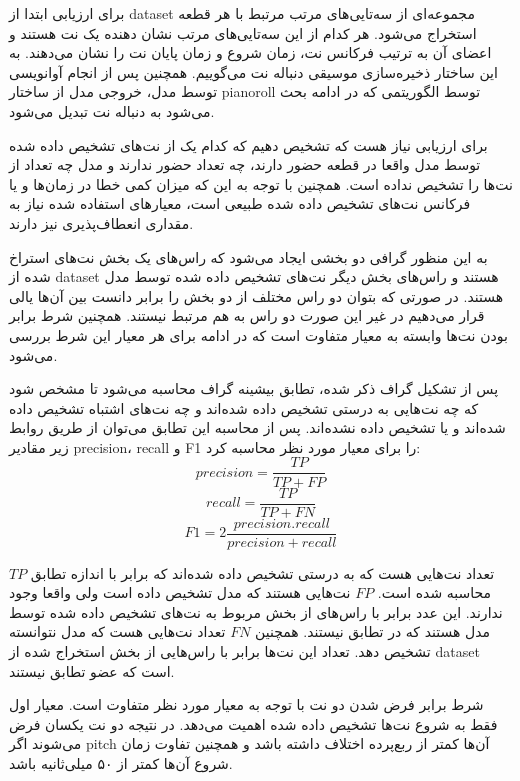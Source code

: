 برای ارزیابی ابتدا از \gls{dataset} مجموعه‌ای از سه‌تایی‌های مرتب مرتبط با هر
قطعه استخراج می‌شود. هر کدام از این سه‌تایی‌های مرتب نشان دهنده یک نت هستند و
اعضای آن به ترتیب فرکانس نت، زمان شروع و زمان پایان نت را نشان می‌دهند. به این
ساختار ذخیره‌سازی موسیقی دنباله نت می‌گوییم. همچنین پس از انجام آوانویسی توسط
مدل، خروجی مدل از ساختار \gls{pianoroll} توسط الگوریتمی که در ادامه بحث می‌شود
به دنباله نت تبدیل می‌شود.

برای ارزیابی نیاز هست که تشخیص دهیم که کدام یک از نت‌های تشخیص داده شده توسط مدل
واقعا در قطعه حضور دارند، چه تعداد حضور ندارند و مدل چه تعداد از نت‌ها را تشخیص
نداده است. همچنین با توجه به این که میزان کمی خطا در زمان‌ها و یا فرکانس نت‌های
تشخیص داده شده طبیعی است، معیارهای استفاده شده نیاز به مقداری انعطاف‌پذیری نیز
دارند.

به این منظور گرافی دو بخشی ایجاد می‌شود که راس‌های یک بخش نت‌های استراخ شده از
\gls{dataset} هستند و راس‌های بخش دیگر نت‌های تشخیص داده شده توسط مدل هستند. در
صورتی که بتوان دو راس مختلف از دو بخش را برابر دانست بین‌ آن‌ها یالی قرار
می‌دهیم در غیر این صورت دو راس به هم مرتبط نیستند. همچنین شرط برابر بودن نت‌ها
وابسته به معیار متفاوت است که در ادامه برای هر معیار این شرط بررسی می‌شود.

پس از تشکیل گراف ذکر شده، تطابق بیشینه گراف محاسبه می‌شود تا مشخص شود که چه
نت‌هایی به درستی تشخیص داده شده‌اند و چه نت‌های اشتباه تشخیص داده شده‌اند و یا
تشخیص داده نشده‌اند. پس از محاسبه این تطابق می‌توان از طریق روابط زیر مقادیر
\gls{precision}، \gls{recall} و F1 را برای معیار مورد نظر محاسبه کرد:
\begin{equation}
    precision = \frac{TP}{TP + FP}
\end{equation}
\begin{equation}
    recall = \frac{TP}{TP + FN}
\end{equation}
\begin{equation}
    F1 = 2 \frac{precision . recall}{precision + recall}
\end{equation}

$TP$ تعداد نت‌هایی هست که به درستی تشخیص داده شده‌اند که برابر با اندازه تطابق
محاسبه شده است. $FP$ نت‌هایی هستند که مدل تشخیص داده است ولی واقعا وجود ندارند.
این عدد برابر با راس‌های از بخش مربوط به نت‌های تشخیص داده شده توسط مدل هستند که
در تطابق نیستند. همچنین $FN$ تعداد نت‌هایی هست که مدل نتوانسته تشخیص دهد. تعداد
این نت‌ها برابر با راس‌هایی از بخش استخراج شده از \gls{dataset} است که عضو تطابق
نیستند.

شرط برابر فرض شدن دو نت با توجه به معیار مورد نظر متفاوت است. معیار اول فقط به
شروع نت‌ها تشخیص داده شده اهمیت می‌دهد. در نتیجه دو نت یکسان فرض می‌شوند اگر
\gls{pitch} آن‌ها کمتر از ربع‌پرده اختلاف داشته باشد و همچنین تفاوت زمان شروع
آن‌ها کمتر از ۵۰ میلی‌ثانیه باشد.

